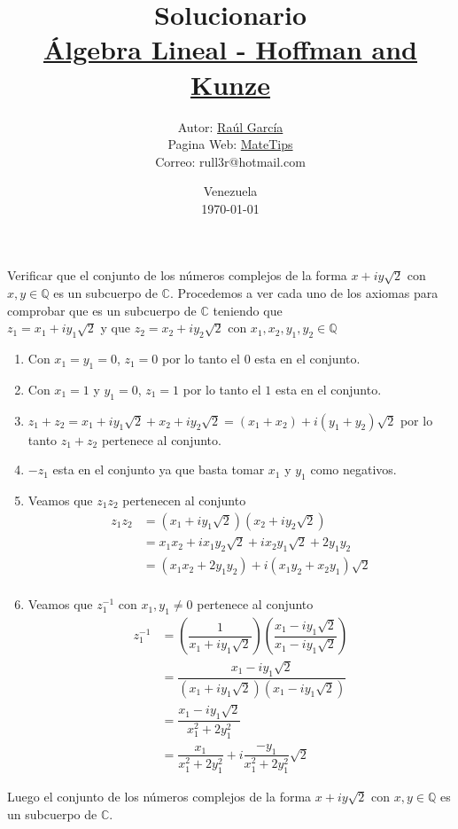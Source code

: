 \documentclass[10pt,a4paper]{jhwhw}
\author{Autor: \href{https://www.facebook.com/ruller}{Raúl García}\\Pagina Web: \href{https://rull3r.github.io/}{MateTips}\\Correo: rull3r@hotmail.com}
\date{Venezuela\\ \today \\}
\title{Solucionario \\\href{https://books.google.co.ve/books?id=XPcoPwAACAAJ}{Álgebra Lineal - Hoffman and Kunze}\\}
\newcommand{\Q}{\mathbb{Q}}
\newcommand{\C}{\mathbb{C}}
\begin{document}
	
	\problema{ }\label{pro:1}
	Verificar que el conjunto de los números complejos de la forma $x+iy\sqrt{2}$ con $x,y\in\Q$ es un subcuerpo de $\C$.
	\solution
	Procedemos a ver cada uno de los axiomas para comprobar que es un subcuerpo de $\C$ teniendo que \\ $z_1=x_1+iy_1\sqrt{2}$ y que $z_2=x_2+iy_2\sqrt{2}$ con $x_1,x_2,y_1,y_2\in\Q$
	\begin{enumerate}[\hspace{1cm}i.]
		\item Con $x_1=y_1=0$, $z_1=0$ por lo tanto el $0$ esta en el conjunto.
		\item Con $x_1=1$ y $y_1=0$, $z_1=1$ por lo tanto el $1$ esta en el conjunto.
		\item $z_1+z_2=x_1+iy_1\sqrt{2}+x_2+iy_2\sqrt{2}=(x_1+x_2)+i(y_1+y_2)\sqrt{2}$ por lo tanto $z_1+z_2$ pertenece al conjunto.
		\item $-z_1$ esta en el conjunto ya que basta tomar $x_1$ y $y_1$ como negativos.
		\item Veamos que $z_1z_2$ pertenecen al conjunto 
		\begin{align*}
		z_1z_2&=(x_1+iy_1\sqrt{2})(x_2+iy_2\sqrt{2})\\
		&=x_1x_2+ix_1y_2\sqrt{2}+ix_2y_1\sqrt{2}+2y_1y_2\\
		&=(x_1x_2+2y_1y_2)+i(x_1y_2+x_2y_1)\sqrt{2}\\
		\end{align*}
		
		\item Veamos que $z_1^{-1}$ con $x_1,y_1\neq0$ pertenece al conjunto
		\begin{align*}
		z_1^{-1}&=\left( \dfrac{1}{x_1+iy_1\sqrt{2}}\right) \left( \dfrac{x_1-iy_1\sqrt{2}}{x_1-iy_1\sqrt{2}}\right) \\
		&=\dfrac{x_1-iy_1\sqrt{2}}{\left(x_1+iy_1\sqrt{2} \right) \left( x_1-iy_1\sqrt{2}\right) }\\
		&=\dfrac{x_1-iy_1\sqrt{2}}{x_1^2+2y_1^2}\\
		&=\dfrac{x_1}{x_1^2+2y_1^2}+i\dfrac{-y_1}{x_1^2+2y_1^2}\sqrt{2}
		\end{align*}
	\end{enumerate}
	
	Luego el conjunto de los números complejos de la forma $x+iy\sqrt{2}$ con $x,y\in\Q$ es un subcuerpo de $\C$. \QEPD
	

	
\end{document}
